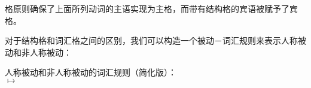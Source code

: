 格原则确保了上面所列动词的主语实现为主格，而带有结构格的宾语被赋予了宾格。

对于结构格和词汇格之间的区别，我们可以构造一个被动－词汇规则来表示人称被动和非人称被动：

\eas
\label{pass-lr-mlr-str}
人称被动和非人称被动的词汇规则（简化版）：\\
 $\mapsto$ \\
\flushright{}
\zs

